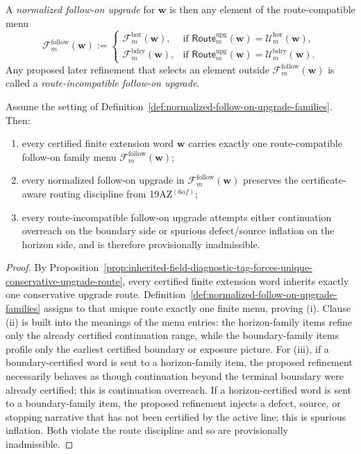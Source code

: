 \begin{definition}
A \emph{normalized follow-on upgrade} for \(\mathbf w\) is then any element of the route-compatible menu
\[
  \mathcal F^{\mathrm{follow}}_{m}(\mathbf w)
  :=
  \begin{cases}
    \mathcal F^{\mathrm{hor}}_{m}(\mathbf w), & \text{if }\mathsf{Route}^{\mathrm{upg}}_{m}(\mathbf w)=\mathcal U^{\mathrm{hor}}_{m}(\mathbf w),\\[2mm]
    \mathcal F^{\mathrm{bdry}}_{m}(\mathbf w), & \text{if }\mathsf{Route}^{\mathrm{upg}}_{m}(\mathbf w)=\mathcal U^{\mathrm{bdry}}_{m}(\mathbf w).
  \end{cases}
\]
Any proposed later refinement that selects an element outside \(\mathcal F^{\mathrm{follow}}_{m}(\mathbf w)\) is called a \emph{route-incompatible follow-on upgrade}.
\end{definition}

\begin{proposition}
\label{prop:every-certified-word-carries-a-finite-route-compatible-follow-on-upgrade-menu}
Assume the setting of Definition~\ref{def:normalized-follow-on-upgrade-families}. Then:
\begin{enumerate}[label=(\roman*)]
  \item every certified finite extension word \(\mathbf w\) carries exactly one route-compatible follow-on family menu \(\mathcal F^{\mathrm{follow}}_{m}(\mathbf w)\);
  \item every normalized follow-on upgrade in \(\mathcal F^{\mathrm{follow}}_{m}(\mathbf w)\) preserves the certificate-aware routing discipline from 19AZ$^{(6af)}$;
  \item every route-incompatible follow-on upgrade attempts either continuation overreach on the boundary side or spurious defect/source inflation on the horizon side, and is therefore provisionally inadmissible.
\end{enumerate}
\end{proposition}

\begin{proof}
By Proposition~\ref{prop:inherited-field-diagnostic-tag-forces-unique-conservative-upgrade-route}, every certified finite extension word inherits exactly one conservative upgrade route. Definition~\ref{def:normalized-follow-on-upgrade-families} assigns to that unique route exactly one finite menu, proving (i). Clause (ii) is built into the meanings of the menu entries: the horizon-family items refine only the already certified continuation range, while the boundary-family items profile only the earliest certified boundary or exposure picture. For (iii), if a boundary-certified word is sent to a horizon-family item, the proposed refinement necessarily behaves as though continuation beyond the terminal boundary were already certified; this is continuation overreach. If a horizon-certified word is sent to a boundary-family item, the proposed refinement injects a defect, source, or stopping narrative that has not been certified by the active line; this is spurious inflation. Both violate the route discipline and so are provisionally inadmissible.
\end{proof}

